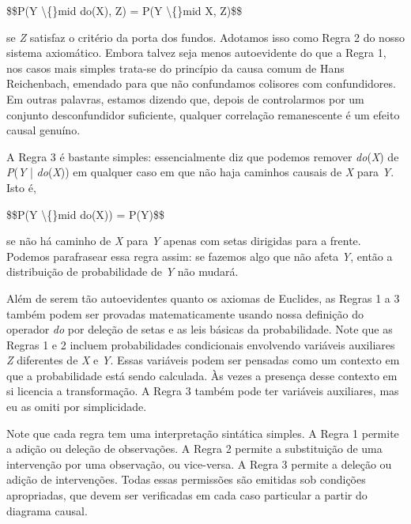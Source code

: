 \documentclass[11pt,a5paper,twoside]{book}
\begin{document}
\$\$P(Y \textbackslash\{\}mid do(X), Z) = P(Y \textbackslash\{\}mid X, Z)\$\$

se \textit{Z} satisfaz o critério da porta dos fundos. Adotamos isso como Regra 2 do nosso sistema axiomático. Embora talvez seja menos autoevidente do que a Regra 1, nos casos mais simples trata-se do princípio da causa comum de Hans Reichenbach, emendado para que não confundamos colisores com confundidores. Em outras palavras, estamos dizendo que, depois de controlarmos por um conjunto desconfundidor suficiente, qualquer correlação remanescente é um efeito causal genuíno.

A Regra 3 é bastante simples: essencialmente diz que podemos remover \textit{do}(\textit{X}) de \textit{P}(\textit{Y} | \textit{do}(\textit{X})) em qualquer caso em que não haja caminhos causais de \textit{X} para \textit{Y}. Isto é,

\$\$P(Y \textbackslash\{\}mid do(X)) = P(Y)\$\$

se não há caminho de \textit{X} para \textit{Y} apenas com setas dirigidas para a frente. Podemos parafrasear essa regra assim: se fazemos algo que não afeta \textit{Y}, então a distribuição de probabilidade de \textit{Y} não mudará.

Além de serem tão autoevidentes quanto os axiomas de Euclides, as Regras 1 a 3 também podem ser provadas matematicamente usando nossa definição do operador \textit{do} por deleção de setas e as leis básicas da probabilidade. Note que as Regras 1 e 2 incluem probabilidades condicionais envolvendo variáveis auxiliares \textit{Z} diferentes de \textit{X} e \textit{Y}. Essas variáveis podem ser pensadas como um contexto em que a probabilidade está sendo calculada. Às vezes a presença desse contexto em si licencia a transformação. A Regra 3 também pode ter variáveis auxiliares, mas eu as omiti por simplicidade.

Note que cada regra tem uma interpretação sintática simples. A Regra 1 permite a adição ou deleção de observações. A Regra 2 permite a substituição de uma intervenção por uma observação, ou vice-versa. A Regra 3 permite a deleção ou adição de intervenções. Todas essas permissões são emitidas sob condições apropriadas, que devem ser verificadas em cada caso particular a partir do diagrama causal.
\end{document}
